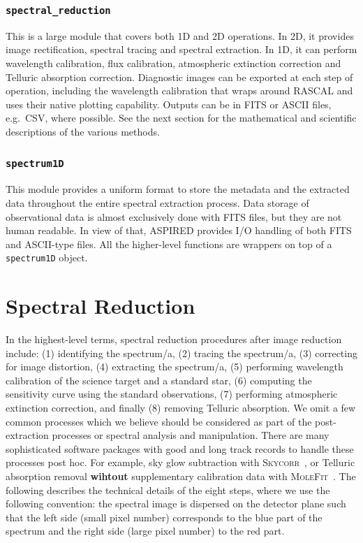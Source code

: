 \documentclass[twocolumn, linenumbers]{aastex631}
\begin{document}
\subsubsection{\texttt{spectral\_reduction}}
This is a large module that covers both 1D and 2D operations. In 2D, it
provides image rectification, spectral tracing and spectral extraction.
In 1D, it can perform wavelength calibration, flux calibration, atmospheric
extinction correction and Telluric absorption correction. Diagnostic images
can be exported at each step of operation, including the wavelength calibration
that wraps around \textsc{RASCAL} and uses their native plotting capability.
Outputs can be in FITS or ASCII files, e.g.\ CSV, where possible. See the next
section for the mathematical and scientific descriptions of the various methods.

\subsubsection{\texttt{spectrum1D}}
This module provides a uniform format to store the metadata
and the extracted data throughout the entire spectral extraction process.
Data storage of observational data is almost exclusively done with FITS files,
but they are not human readable. In view of that, \textsc{ASPIRED} provides I/O handling
of both FITS and ASCII-type files. All the higher-level functions are wrappers on
top of a \texttt{spectrum1D} object.

\section{Spectral Reduction}
In the highest-level terms, spectral reduction procedures after image
reduction include: (1) identifying the spectrum/a, (2) tracing the
spectrum/a, (3) correcting for image distortion, (4) extracting the
spectrum/a, (5) performing wavelength calibration of the science target and a
standard star, (6) computing the sensitivity curve using the standard
observations, (7) performing atmospheric extinction correction,
and finally (8) removing Telluric absorption. We omit a few common
processes which we believe should be considered as part of the
post-extraction processes or spectral analysis and manipulation.
There are many sophisticated software packages with good and long track records
to handle these processes post hoc. For example, sky glow subtraction
with \textsc{Skycorr}~\citep{2014A&A...567A..25N}, or Telluric
absorption removal \textbf{wihtout} supplementary calibration data with
\textsc{MoleFit}~\citep{2015A&A...576A..77S, 2015A&A...576A..78K}.
The following describes the technical details of the eight steps,
where we use the following convention: the spectral image is dispersed
on the detector plane such that the left side (small pixel number) corresponds to
the blue part of the spectrum and the right side (large pixel number) to the red part.
\end{document}
